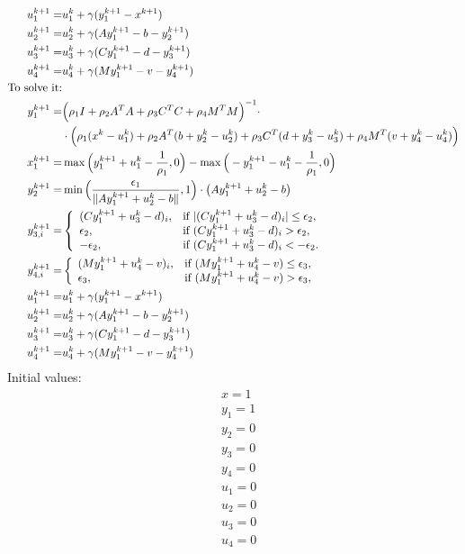 \documentclass[annual]{acmsiggraph}
\begin{document}
\begin{align}
u_1^{k+1}=&u_1^k+\gamma(y_1^{k+1}-x^{k+1})\\
u_2^{k+1}=&u_2^k+\gamma(Ay_1^{k+1}-b-y_2^{k+1})\\
u_3^{k+1}=&u_3^k+\gamma(Cy_1^{k+1}-d-y_3^{k+1})\\
u_4^{k+1}=&u_4^k+\gamma(My_1^{k+1}-v-y_4^{k+1})\\
\mbox{To solve it:}\notag\\
y_1^{k+1}=&\Big( \rho_1 I+ \rho_2 A^TA+ \rho_3 C^TC+ \rho_4 M^TM\Big)^{-1}\cdot\notag\\
&\cdot\Big(\rho_1 (x^k-u_1^k)+\rho_2 A^T(b+y_2^k-u_2^k)+ \rho_3 C^T(d+y_3^k-u_3^k)+\rho_4 M^T(v+y_4^k-u_4^k)\Big)\\
x_1^{k+1}=&\max\Big(y_1^{k+1}+u_1^k-\frac{1}{\rho_1}, 0\Big) - \max\Big(-y_1^{k+1}-u_1^k-\frac{1}{\rho_1}, 0\Big)\\
y_2^{k+1}=&\min\Big(\frac{\epsilon_1}{\|Ay_1^{k+1}+u_2^k-b\|},1\Big)\cdot\big(Ay_1^{k+1}+u_2^k-b\big)\\
y_{3,i}^{k+1}=&\left\{
\begin{array}{ll}
(Cy_1^{k+1}+u_3^k-d)_i, &\mbox{if }|(Cy_1^{k+1}+u_3^k-d)_i|\leq\epsilon_2,\\
\epsilon_2, &\mbox{if }(Cy_1^{k+1}+u_3^k-d)_i>\epsilon_2,\\
-\epsilon_2, &\mbox{if }(Cy_1^{k+1}+u_3^k-d)_i<-\epsilon_2.\\
\end{array}
\right.\\
y_{4,i}^{k+1}=&\left\{
\begin{array}{ll}
(My_1^{k+1}+u_4^k-v)_i, &\mbox{if }(My_1^{k+1}+u_4^k-v)\leq\epsilon_3,\\
\epsilon_3, &\mbox{if }(My_1^{k+1}+u_4^k-v)>\epsilon_3,\\
\end{array}
\right.\\
u_1^{k+1}=&u_1^k+\gamma(y_1^{k+1}-x^{k+1})\\
u_2^{k+1}=&u_2^k+\gamma(Ay_1^{k+1}-b-y_2^{k+1})\\
u_3^{k+1}=&u_3^k+\gamma(Cy_1^{k+1}-d-y_3^{k+1})\\
u_4^{k+1}=&u_4^k+\gamma(My_1^{k+1}-v-y_4^{k+1})
\end{align}
Initial values:
\begin{align*}
&x=1\\
&y_1=1\\
&y_2=0\\
&y_3=0\\
&y_4=0\\
&u_1=0\\
&u_2=0\\
&u_3=0\\
&u_4=0
\end{align*}
\end{document}
